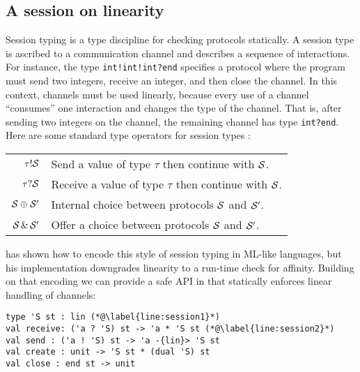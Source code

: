 \subsection{A session on linearity}
\label{sec:session-linearity}

Session typing \cite{Honda1993,DBLP:conf/esop/HondaVK98} is a type
discipline for checking protocols statically. A session type is
ascribed to a communication channel and describes
a sequence of interactions. For instance, the type
\lstinline{int!int!int?end} specifies a protocol
where the program must send two integers, receive an integer, and then
close the channel.
%
In this context, channels must be used linearly, because every use of
a channel ``consumes'' one interaction and  changes the type of the
channel. That is, after sending two integers on the channel,
the remaining channel has type \lstinline{int?end}.
%
Here are some standard type operators for session types \SType:
\begin{center}
  \begin{tabular}[t]{rl}
    $\tau ! \mathcal S$ & Send a value of type $\tau$ then continue with $\mathcal S$.\\
    $\tau ? \mathcal S$& Receive a value of type $\tau$ then continue with $\mathcal S$.\\
    $\mathcal S \oplus \mathcal S'$& Internal choice between protocols $\mathcal S$ and $\mathcal S'$.\\
    $\mathcal S \operatorname{\&} \mathcal S'$
                    & Offer a choice between protocols $\mathcal S$ and $\mathcal S'$.
  \end{tabular}
\end{center}

\citet{DBLP:journals/jfp/Padovani17}  has shown how to encode this
style of session typing in ML-like languages, but his implementation
downgrades linearity to a run-time check for affinity. Building on that
encoding we can provide a safe API in \lang that statically enforces
linear handling of channels:
%
\begin{lstlisting}
type 'S st : lin (*@\label{line:session1}*)
val receive: ('a ? 'S) st -> 'a * 'S st (*@\label{line:session2}*)
val send : ('a ! 'S) st -> 'a -{lin}> 'S st
val create : unit -> 'S st * (dual 'S) st
val close : end st -> unit
\end{lstlisting}

